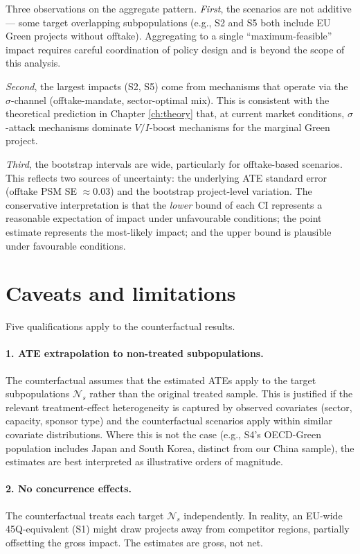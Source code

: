 Three observations on the aggregate pattern. \emph{First}, the scenarios are not additive --- some target overlapping subpopulations (e.g., S2 and S5 both include EU Green projects without offtake). Aggregating to a single ``maximum-feasible'' impact requires careful coordination of policy design and is beyond the scope of this analysis.

\emph{Second}, the largest impacts (S2, S5) come from mechanisms that operate via the $\sigma$-channel (offtake-mandate, sector-optimal mix). This is consistent with the theoretical prediction in Chapter \ref{ch:theory} that, at current market conditions, $\sigma$-attack mechanisms dominate $V/I$-boost mechanisms for the marginal Green project.

\emph{Third}, the bootstrap intervals are wide, particularly for offtake-based scenarios. This reflects two sources of uncertainty: the underlying ATE standard error (offtake PSM SE $\approx 0.03$) and the bootstrap project-level variation. The conservative interpretation is that the \emph{lower} bound of each CI represents a reasonable expectation of impact under unfavourable conditions; the point estimate represents the most-likely impact; and the upper bound is plausible under favourable conditions.

\section{Caveats and limitations}
\label{sec:counterfactual_caveats}

Five qualifications apply to the counterfactual results.

\paragraph{1. ATE extrapolation to non-treated subpopulations.} The counterfactual assumes that the estimated ATEs apply to the target subpopulations $\mathcal{N}_s$ rather than the original treated sample. This is justified if the relevant treatment-effect heterogeneity is captured by observed covariates (sector, capacity, sponsor type) and the counterfactual scenarios apply within similar covariate distributions. Where this is not the case (e.g., S4's OECD-Green population includes Japan and South Korea, distinct from our China sample), the estimates are best interpreted as illustrative orders of magnitude.

\paragraph{2. No concurrence effects.} The counterfactual treats each target $\mathcal{N}_s$ independently. In reality, an EU-wide 45Q-equivalent (S1) might draw projects away from competitor regions, partially offsetting the gross impact. The estimates are gross, not net.

